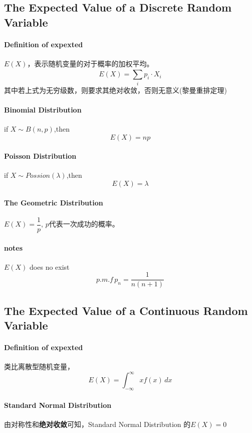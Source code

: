 \documentclass[12pt,a4paper]{ctexart}
\begin{document}
\subsection{The Expected Value of a  Discrete Random Variable}
\paragraph{Definition of expexted}$ E \left(X\right) $，表示随机变量的对于概率的加权平均。
\[ E \left(X\right)=\sum_{i}^{} p_{i}\cdot X_{i}\]
其中若上式为无穷级数，则要求其绝对收敛，否则无意义(黎曼重排定理)

\paragraph{Binomial Distribution}if $ X \sim B \left(n,p\right) $,then\[ E\left(X\right)=np \]
\paragraph{Poisson Distribution }if $ X \sim Possion \left(\lambda\right) $,then\[ E \left(X\right)=\lambda \]

\paragraph{The Geometric Distribution} $ E \left(X\right)=\dfrac{1}{p} $,  $ p $代表一次成功的概率。

\paragraph{notes} $ E \left(X\right)  $ does no exist \[ p.m.f \, p_n=\dfrac{1}{n\left(n+1\right)}   \]

\subsection{The Expected Value of a  Continuous Random Variable}
\paragraph{Definition of expexted}类比离散型随机变量，
\[ E \left(X\right)=\int_{-\infty}^{\infty} x f\left(x\right) \, dx\]

\paragraph{Standard Normal Distribution}
由对称性和\textbf{绝对收敛}可知，Standard Normal Distribution 的$
 E\left(X\right) =0$
 
\end{document}
